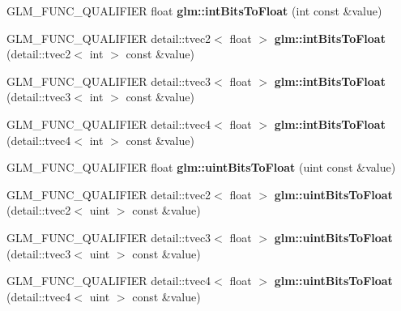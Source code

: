 \begin{DoxyCompactItemize}
\item 
\hypertarget{namespaceglm_aa13860620ac74cd63473808c6566b004}{\-G\-L\-M\-\_\-\-F\-U\-N\-C\-\_\-\-Q\-U\-A\-L\-I\-F\-I\-E\-R float {\bfseries glm\-::int\-Bits\-To\-Float} (int const \&value)}\label{namespaceglm_aa13860620ac74cd63473808c6566b004}

\item 
\hypertarget{namespaceglm_aeff766c2b3cd8e57cc766db3d6c05584}{\-G\-L\-M\-\_\-\-F\-U\-N\-C\-\_\-\-Q\-U\-A\-L\-I\-F\-I\-E\-R \*
detail\-::tvec2$<$ float $>$ {\bfseries glm\-::int\-Bits\-To\-Float} (detail\-::tvec2$<$ int $>$ const \&value)}\label{namespaceglm_aeff766c2b3cd8e57cc766db3d6c05584}

\item 
\hypertarget{namespaceglm_aee5c11244c968fb1c469ef36b8bee088}{\-G\-L\-M\-\_\-\-F\-U\-N\-C\-\_\-\-Q\-U\-A\-L\-I\-F\-I\-E\-R \*
detail\-::tvec3$<$ float $>$ {\bfseries glm\-::int\-Bits\-To\-Float} (detail\-::tvec3$<$ int $>$ const \&value)}\label{namespaceglm_aee5c11244c968fb1c469ef36b8bee088}

\item 
\hypertarget{namespaceglm_a294e8d88fb5291ef59df36fb925d70bc}{\-G\-L\-M\-\_\-\-F\-U\-N\-C\-\_\-\-Q\-U\-A\-L\-I\-F\-I\-E\-R \*
detail\-::tvec4$<$ float $>$ {\bfseries glm\-::int\-Bits\-To\-Float} (detail\-::tvec4$<$ int $>$ const \&value)}\label{namespaceglm_a294e8d88fb5291ef59df36fb925d70bc}

\item 
\hypertarget{namespaceglm_aa621d0e67181e4ccd5588259bcc393ab}{\-G\-L\-M\-\_\-\-F\-U\-N\-C\-\_\-\-Q\-U\-A\-L\-I\-F\-I\-E\-R float {\bfseries glm\-::uint\-Bits\-To\-Float} (uint const \&value)}\label{namespaceglm_aa621d0e67181e4ccd5588259bcc393ab}

\item 
\hypertarget{namespaceglm_a5ce140553687f4d212a18f472972c543}{\-G\-L\-M\-\_\-\-F\-U\-N\-C\-\_\-\-Q\-U\-A\-L\-I\-F\-I\-E\-R \*
detail\-::tvec2$<$ float $>$ {\bfseries glm\-::uint\-Bits\-To\-Float} (detail\-::tvec2$<$ uint $>$ const \&value)}\label{namespaceglm_a5ce140553687f4d212a18f472972c543}

\item 
\hypertarget{namespaceglm_ac96c797cb01d4d6db5a0b5537b56697b}{\-G\-L\-M\-\_\-\-F\-U\-N\-C\-\_\-\-Q\-U\-A\-L\-I\-F\-I\-E\-R \*
detail\-::tvec3$<$ float $>$ {\bfseries glm\-::uint\-Bits\-To\-Float} (detail\-::tvec3$<$ uint $>$ const \&value)}\label{namespaceglm_ac96c797cb01d4d6db5a0b5537b56697b}

\item 
\hypertarget{namespaceglm_a8facefb72a43a5283824d120347b6537}{\-G\-L\-M\-\_\-\-F\-U\-N\-C\-\_\-\-Q\-U\-A\-L\-I\-F\-I\-E\-R \*
detail\-::tvec4$<$ float $>$ {\bfseries glm\-::uint\-Bits\-To\-Float} (detail\-::tvec4$<$ uint $>$ const \&value)}\label{namespaceglm_a8facefb72a43a5283824d120347b6537}


\end{DoxyCompactItemize}
